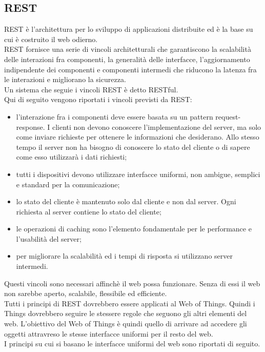 \documentclass{article}
\begin{document}
\subsection{REST}
REST è l'architettura per lo sviluppo di applicazioni distribuite ed è la base su cui è costruito il web odierno. \\
REST fornisce una serie di vincoli architetturali che garantiscono la scalabilità delle interazioni fra componenti, la generalità delle interfacce, l'aggiornamento indipendente dei componenti e componenti intermedi che riducono la latenza fra le interazioni e migliorano la sicurezza. \\ Un sistema che seguie i vincoli REST è detto RESTful. \\ 
Qui di seguito vengono riportati i vincoli previsti da REST:
\begin{itemize}
    \item l'interazione fra i componenti deve essere basata su un pattern request-response. I clienti non devono conoscere l'implementazione del server, ma solo come inviare richieste per ottenere le informazioni che desiderano. Allo stesso tempo il server non ha bisogno di conoscere lo stato del cliente o di sapere come esso utilizzarà i dati richiesti;
    \item tutti i dispositivi devono utilizzare interfacce uniformi, non ambigue, semplici e standard per la comunicazione;
    \item lo stato del cliente è mantenuto solo dal cliente e non dal server. Ogni richiesta al server contiene lo stato del cliente;
    \item le operazioni di caching sono l'elemento fondamentale per le performance e l'usabilità del server;
    \item per migliorare la scalabilità ed i tempi di risposta si utilizzano server intermedi.
\end{itemize}
Questi vincoli sono necessari affinchè il web possa funzionare. Senza di essi il web non sarebbe aperto, scalabile, flessibile ed efficiente.\\
Tutti i principi di REST dovrebbero essere applicati al Web of Things. Quindi i Things dovrebbero seguire le stessere regole che seguono gli altri elementi del web. L'obiettivo del Web of Things è quindi quello di arrivare ad accedere gli oggetti attravreso le stesse interfacce uniformi per il resto del web. \\
I principi su cui si basano le interfacce uniformi del web sono riportati di seguito.
\end{document}
